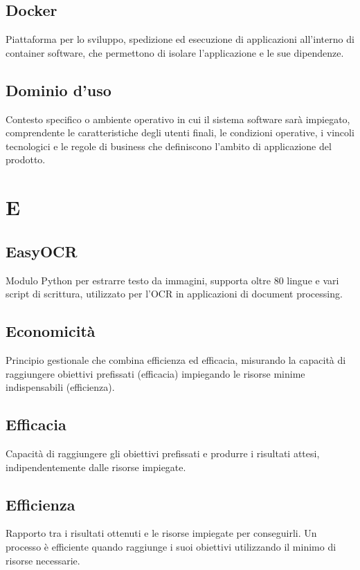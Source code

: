 \documentclass[a4paper,11pt]{article}
\begin{document}
\subsection{Docker}
Piattaforma per lo sviluppo, spedizione ed esecuzione di applicazioni all'interno di container software, che permettono di isolare l'applicazione e le sue dipendenze.

\subsection{Dominio d'uso}
Contesto specifico o ambiente operativo in cui il sistema software sarà impiegato, comprendente le caratteristiche degli utenti finali, le condizioni operative, i vincoli tecnologici e le regole di business che definiscono l'ambito di applicazione del prodotto.

\newpage
\section{E}

\subsection{EasyOCR}
Modulo Python per estrarre testo da immagini, supporta oltre 80 lingue e vari script di scrittura, utilizzato per l'OCR in applicazioni di document processing.

\subsection{Economicità}
Principio gestionale che combina efficienza ed efficacia, misurando la capacità di raggiungere obiettivi prefissati (efficacia) impiegando le risorse minime indispensabili (efficienza).

\subsection{Efficacia}
Capacità di raggiungere gli obiettivi prefissati e produrre i risultati attesi, indipendentemente dalle risorse impiegate.

\subsection{Efficienza}
Rapporto tra i risultati ottenuti e le risorse impiegate per conseguirli. Un processo è efficiente quando raggiunge i suoi obiettivi utilizzando il minimo di risorse necessarie.
\end{document}
